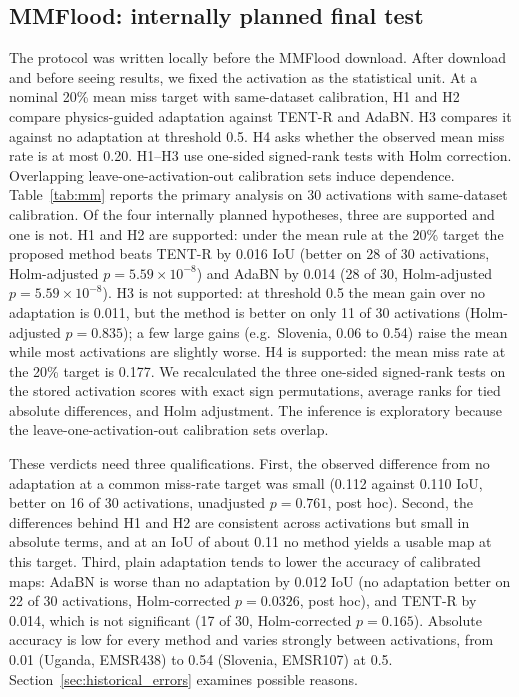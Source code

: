 \subsection{MMFlood: internally planned final test}
\label{sec:mm}
The protocol was written locally before the MMFlood download. After download and before seeing results, we fixed the activation as the statistical unit. At a nominal 20\% mean miss target with same-dataset calibration, H1 and H2 compare physics-guided adaptation against TENT-R and AdaBN. H3 compares it against no adaptation at threshold 0.5. H4 asks whether the observed mean miss rate is at most 0.20. H1--H3 use one-sided signed-rank tests with Holm correction. Overlapping leave-one-activation-out calibration sets induce dependence.
Table~\ref{tab:mm} reports the primary analysis on 30 activations with same-dataset calibration. Of the four internally planned hypotheses, three are supported and one is not. H1 and H2 are supported: under the mean rule at the 20\% target the proposed method beats TENT-R by 0.016 IoU (better on 28 of 30 activations, Holm-adjusted $p=5.59\times10^{-8}$) and AdaBN by 0.014 (28 of 30, Holm-adjusted $p=5.59\times10^{-8}$). H3 is not supported: at threshold 0.5 the mean gain over no adaptation is 0.011, but the method is better on only 11 of 30 activations (Holm-adjusted $p=0.835$); a few large gains (e.g.\ Slovenia, 0.06 to 0.54) raise the mean while most activations are slightly worse. H4 is supported: the mean miss rate at the 20\% target is 0.177. We recalculated the three one-sided signed-rank tests on the stored activation scores with exact sign permutations, average ranks for tied absolute differences, and Holm adjustment. The inference is exploratory because the leave-one-activation-out calibration sets overlap.

These verdicts need three qualifications. First, the observed difference from no adaptation at a common miss-rate target was small (0.112 against 0.110 IoU, better on 16 of 30 activations, unadjusted $p=0.761$, post hoc). Second, the differences behind H1 and H2 are consistent across activations but small in absolute terms, and at an IoU of about 0.11 no method yields a usable map at this target. Third, plain adaptation tends to lower the accuracy of calibrated maps: AdaBN is worse than no adaptation by 0.012 IoU (no adaptation better on 22 of 30 activations, Holm-corrected $p=0.0326$, post hoc), and TENT-R by 0.014, which is not significant (17 of 30, Holm-corrected $p=0.165$). Absolute accuracy is low for every method and varies strongly between activations, from 0.01 (Uganda, EMSR438) to 0.54 (Slovenia, EMSR107) at 0.5. Section~\ref{sec:historical_errors} examines possible reasons.

